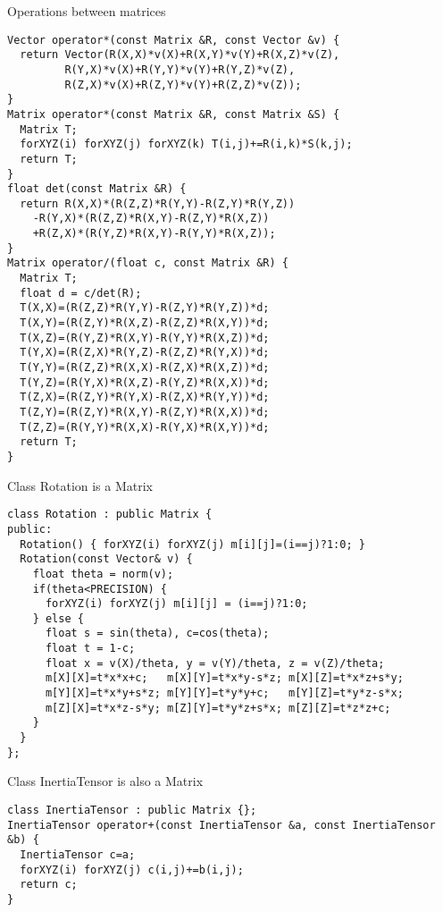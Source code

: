 Operations between matrices
\begin{lstlisting}
Vector operator*(const Matrix &R, const Vector &v) {
  return Vector(R(X,X)*v(X)+R(X,Y)*v(Y)+R(X,Z)*v(Z),
		 R(Y,X)*v(X)+R(Y,Y)*v(Y)+R(Y,Z)*v(Z),
		 R(Z,X)*v(X)+R(Z,Y)*v(Y)+R(Z,Z)*v(Z));
}
Matrix operator*(const Matrix &R, const Matrix &S) {
  Matrix T;
  forXYZ(i) forXYZ(j) forXYZ(k) T(i,j)+=R(i,k)*S(k,j);
  return T;
}
float det(const Matrix &R) {
  return R(X,X)*(R(Z,Z)*R(Y,Y)-R(Z,Y)*R(Y,Z))
    -R(Y,X)*(R(Z,Z)*R(X,Y)-R(Z,Y)*R(X,Z))
    +R(Z,X)*(R(Y,Z)*R(X,Y)-R(Y,Y)*R(X,Z));
}
Matrix operator/(float c, const Matrix &R) {
  Matrix T;
  float d = c/det(R);
  T(X,X)=(R(Z,Z)*R(Y,Y)-R(Z,Y)*R(Y,Z))*d;
  T(X,Y)=(R(Z,Y)*R(X,Z)-R(Z,Z)*R(X,Y))*d;
  T(X,Z)=(R(Y,Z)*R(X,Y)-R(Y,Y)*R(X,Z))*d;
  T(Y,X)=(R(Z,X)*R(Y,Z)-R(Z,Z)*R(Y,X))*d;
  T(Y,Y)=(R(Z,Z)*R(X,X)-R(Z,X)*R(X,Z))*d;
  T(Y,Z)=(R(Y,X)*R(X,Z)-R(Y,Z)*R(X,X))*d;
  T(Z,X)=(R(Z,Y)*R(Y,X)-R(Z,X)*R(Y,Y))*d;
  T(Z,Y)=(R(Z,Y)*R(X,Y)-R(Z,Y)*R(X,X))*d;
  T(Z,Z)=(R(Y,Y)*R(X,X)-R(Y,X)*R(X,Y))*d;
  return T;
}
\end{lstlisting}

Class Rotation is a Matrix
\begin{lstlisting}
class Rotation : public Matrix {
public:
  Rotation() { forXYZ(i) forXYZ(j) m[i][j]=(i==j)?1:0; }
  Rotation(const Vector& v) {
    float theta = norm(v);    
    if(theta<PRECISION) {
      forXYZ(i) forXYZ(j) m[i][j] = (i==j)?1:0;
    } else {
      float s = sin(theta), c=cos(theta);
      float t = 1-c;
      float x = v(X)/theta, y = v(Y)/theta, z = v(Z)/theta;
      m[X][X]=t*x*x+c;   m[X][Y]=t*x*y-s*z; m[X][Z]=t*x*z+s*y;
      m[Y][X]=t*x*y+s*z; m[Y][Y]=t*y*y+c;   m[Y][Z]=t*y*z-s*x;
      m[Z][X]=t*x*z-s*y; m[Z][Y]=t*y*z+s*x; m[Z][Z]=t*z*z+c;
    }
  }
};
\end{lstlisting}

Class InertiaTensor is also a Matrix
\begin{lstlisting}
class InertiaTensor : public Matrix {};
InertiaTensor operator+(const InertiaTensor &a, const InertiaTensor &b) {
  InertiaTensor c=a;
  forXYZ(i) forXYZ(j) c(i,j)+=b(i,j);
  return c;
}
\end{lstlisting}

